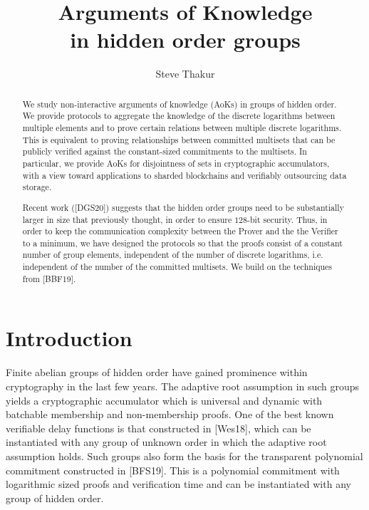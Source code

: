 \documentclass[11pt, lettersize, notitlepage, leqno, footskip=0.6cm]{article}
\numberwithin{equation}{section}
\begin{document}
 
\title{Arguments of Knowledge\\ in hidden order groups}
\author{Steve Thakur}
\affil{}
\date{\vspace{-6ex}}
 
\maketitle

\begin{abstract} We study non-interactive arguments of knowledge (AoKs) in groups of hidden order. We provide protocols to aggregate the knowledge of the discrete logarithms between multiple elements and to prove certain relations between multiple discrete logarithms. This is equivalent to proving relationships between committed multisets that can be publicly verified against the constant-sized commitments to the multisets. In particular, we provide AoKs for disjointness of sets in cryptographic accumulators, with a view toward applications to sharded blockchains and verifiably outsourcing data storage. 

Recent work ([DGS20]) suggests that the hidden order groups need to be substantially larger in size that previously thought, in order to ensure $128$-bit security. Thus, in order to keep the communication complexity between the Prover and the the Verifier to a minimum, we have designed the protocols so that the proofs consist of a constant number of group elements, independent of the number of discrete logarithms, i.e. independent of the number of the committed multisets. We build on the techniques from [BBF19].\end{abstract}

\section{\fontsize{12}{12}\selectfont Introduction  }


Finite abelian groups of hidden order have gained prominence within cryptography in the last few years. The adaptive root assumption in such groups yields a cryptographic accumulator which is universal and dynamic with batchable membership and non-membership proofs. One of the best known verifiable delay functions is that constructed in [Wes18], which can be instantiated with any group of unknown order in which the adaptive root assumption holds. Such groups also form the basis for the transparent polynomial commitment constructed in [BFS19]. This is a polynomial commitment with logarithmic sized proofs and verification time and can be instantiated with any group of hidden order.
\end{document}
